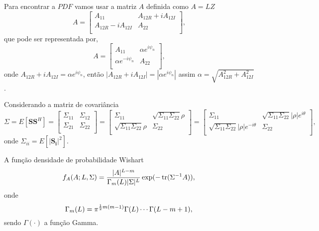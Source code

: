 Para encontrar a $PDF$ vamos usar a matriz $A$ definida como $A=LZ$
\begin{equation*}
	A=\left[
\begin{array}{cc}
	A_{11}              & A_{12R}+iA_{12I} \\
	A_{12R}-iA_{12I}    & A_{22} \\
\end{array}\right],
\end{equation*}
que pode ser representada por,
\begin{equation*}
	A=\left[
\begin{array}{cc}
	A_{11}              & \alpha e^{i\psi_n} \\
	\alpha e^{-i\psi_n} & A_{22} \\
\end{array}\right],
\end{equation*}
onde $A_{12R}+iA_{12I}=\alpha e^{i\psi_n}$, então $|A_{12R}+iA_{12I}|=|\alpha e^{i\psi_n}|$ assim $\alpha=\sqrt{A_{12R}^2+A_{12I}^2}$.

Considerando a matriz de covariância
\begin{equation*}
	\Sigma = E[\mathbf{SS}^H]=
	\left[
\begin{array}{cc}
	\Sigma_{11}              & \Sigma_{12}\\
    \Sigma_{21}              & \Sigma_{22}\\
\end{array}\right]
=\left[
\begin{array}{cc}
	\Sigma_{11}              & \sqrt{\Sigma_{11}\Sigma_{22}}\rho \\
 \sqrt{\Sigma_{11}\Sigma_{22}}\rho & \Sigma_{22}\\
\end{array}\right]
	=\left[
\begin{array}{cc}
	\Sigma_{11}              & \sqrt{\Sigma_{11}\Sigma_{22}}|\rho| e^{i\theta} \\
 \sqrt{\Sigma_{11}\Sigma_{22}}|\rho|e^{-i\theta} & \Sigma_{22}\\
\end{array}\right],
\end{equation*}
onde $\Sigma_{ii}=E[|\mathbf{S_i}|^2]$.

A função densidade de probabilidade Wishart 
\begin{equation*}
	f_A(A; L,\Sigma)=\frac{|A|^{L-m}}{\Gamma_m(L)|\Sigma|^L} \exp(-\operatorname{tr}(\Sigma^{-1}A)), \\
\end{equation*}
onde
\begin{equation*}
\Gamma_m(L)=\pi^{\frac{1}{2}m(m-1)}\Gamma(L)\cdots\Gamma(L-m+1), \\
\end{equation*}
sendo $\Gamma(\cdot)$ a função Gamma.

